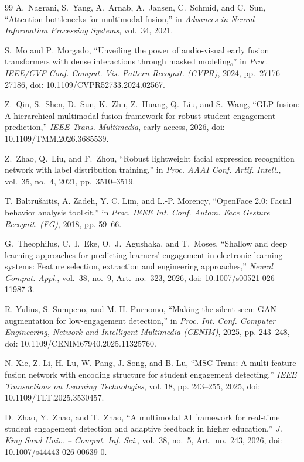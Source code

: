 \documentclass[journal]{IEEEtran}
\begin{document}
\begin{thebibliography}{99}
A.~Nagrani, S.~Yang, A.~Arnab, A.~Jansen, C.~Schmid, and C.~Sun, ``Attention bottlenecks for multimodal fusion,'' in \emph{Advances in Neural Information Processing Systems}, vol.~34, 2021.

S.~Mo and P.~Morgado, ``Unveiling the power of audio-visual early fusion transformers with dense interactions through masked modeling,'' in \emph{Proc. IEEE/CVF Conf. Comput. Vis. Pattern Recognit. (CVPR)}, 2024, pp.~27176--27186, doi: 10.1109/CVPR52733.2024.02567.

Z.~Qin, S.~Shen, D.~Sun, K.~Zhu, Z.~Huang, Q.~Liu, and S.~Wang, ``GLP-fusion: A hierarchical multimodal fusion framework for robust student engagement prediction,'' \emph{IEEE Trans. Multimedia}, early access, 2026, doi: 10.1109/TMM.2026.3685539.

Z.~Zhao, Q.~Liu, and F.~Zhou, ``Robust lightweight facial expression recognition network with label distribution training,'' in \emph{Proc. AAAI Conf. Artif. Intell.}, vol.~35, no.~4, 2021, pp.~3510--3519.

T. Baltru\v{s}aitis, A. Zadeh, Y. C. Lim, and L.-P. Morency, ``OpenFace 2.0: Facial behavior analysis toolkit,'' in \emph{Proc. IEEE Int. Conf. Autom. Face Gesture Recognit. (FG)}, 2018, pp. 59--66.

G.~Theophilus, C.~I.~Eke, O.~J.~Agushaka, and T.~Moses, ``Shallow and deep learning approaches for predicting learners' engagement in electronic learning systems: Feature selection, extraction and engineering approaches,'' \emph{Neural Comput. Appl.}, vol.~38, no.~9, Art.~no.~323, 2026, doi: 10.1007/s00521-026-11987-3.

R. Yulius, S. Sumpeno, and M. H. Purnomo, ``Making the silent seen: GAN augmentation for low-engagement detection,'' in \emph{Proc. Int. Conf. Computer Engineering, Network and Intelligent Multimedia (CENIM)}, 2025, pp. 243--248, doi: 10.1109/CENIM67940.2025.11325760.

N. Xie, Z. Li, H. Lu, W. Pang, J. Song, and B. Lu, ``MSC-Trans: A multi-feature-fusion network with encoding structure for student engagement detecting,'' \emph{IEEE Transactions on Learning Technologies}, vol. 18, pp. 243--255, 2025, doi: 10.1109/TLT.2025.3530457.

D.~Zhao, Y.~Zhao, and T.~Zhao, ``A multimodal AI framework for real-time student engagement detection and adaptive feedback in higher education,'' \emph{J. King Saud Univ. -- Comput. Inf. Sci.}, vol.~38, no.~5, Art.~no.~243, 2026, doi: 10.1007/s44443-026-00639-0.


\end{thebibliography}
\end{document}
